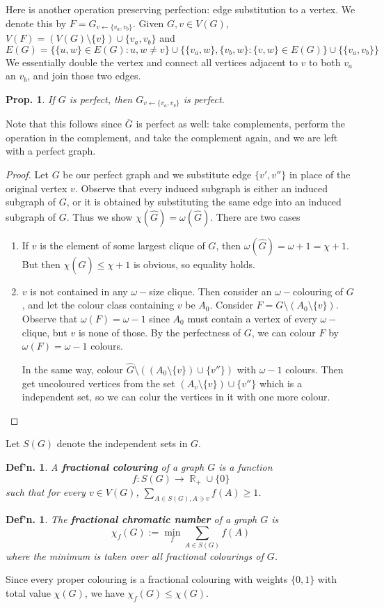 \documentclass[12pt, a4paper]{book}
\DeclareMathOperator{\R}{\mathbb{R}}
\newtheorem{definition}[theorem]{Def'n.}
\newtheorem{proposition}[theorem]{Prop.}
\theoremstyle{nonumberplain}
\newtheorem{proof}{Proof}
\begin{document}
Here is another operation preserving perfection: edge substitution to a vertex.
We denote this by $F=G_{v\gets\{v_a,v_b\}}$.
Given $G,v\in V(G)$, $V(F)=(V(G)\setminus\{v\})\cup\{v_a,v_b\}$ and
\[E(G)=\{\{u,w\}\in E(G):u,w\neq v\}\cup\{\{v_a,w\},\{v_b,w\}: \{v,w\}\in E(G)\}\cup\{\{v_a,v_b\}\}\]
We essentially double the vertex and connect all vertices adjacent to $v$ to both $v_a$ an $v_b$, and join those two edges.
\begin{proposition}
    If $G$ is perfect, then $G_{v\gets\{v_a,v_b\}}$ is perfect.
\end{proposition}
Note that this follows since $\overline{G}$ is perfect as well: take complements, perform the operation in the complement, and take the complement again, and we are left with a perfect graph.
\begin{proof}
    Let $G$ be our perfect graph and we substitute edge $\{v',v''\}$ in place of the original vertex $v$.
    Observe that every induced subgraph is either an induced subgraph of $G$, or it is obtained by substituting the same edge into an induced subgraph of $G$.
    Thus we show $\chi(\hat G)=\omega(\hat G)$.
    There are two cases
    \begin{enumerate}
        \item If $v$ is the element of some largest clique of $G$, then $\omega(\hat G)=\omega+1=\chi+1$.
            But then $\chi(\hat G)\leq\chi+1$ is obvious, so equality holds.
        \item $v$ is not contained in any $\omega-$size clique.
            Then consider an $\omega-$colouring of $G$, and let the colour class containing $v$ be $A_0$.
            Consider $F=G\setminus(A_0\setminus\{v\})$.
            Observe that $\omega(F)=\omega-1$ since $A_0$ must contain a vertex of every $\omega-$clique, but $v$ is none of those.
            By the perfectness of $G$, we can colour $F$ by $\omega(F)=\omega-1$ colours.

            In the same way, colour $\hat G\setminus\left((A_0\setminus\{v\})\cup\{v''\}\right)$ with $\omega-1$ colours.
            Then get uncoloured vertices from the set $(A_v\setminus\{v\})\cup\{v''\}$ which is a independent set, so we can colur the vertices in it with one more colour.
    \end{enumerate}
\end{proof}
Let $S(G)$ denote the independent sets in $G$.
\begin{definition}
    A \textbf{fractional colouring} of a graph $G$ is a function
    \[f:S(G)\to\R_+\cup\{0\}\]
    such that for every $v\in V(G)$, $\sum\limits_{A\in S(G),A\ni v}f(A)\geq 1$.
\end{definition}
\begin{definition}
    The \textbf{fractional chromatic number} of a graph $G$ is
    \[\chi_f(G):=\min_f\sum\limits_{A\in S(G)}f(A)\]
    where the minimum is taken over all fractional colourings of $G$.
\end{definition}
Since every proper colouring is a fractional colouring with weights $\{0,1\}$ with total value $\chi(G)$, we have $\chi_f(G)\leq\chi(G)$.
\end{document}
